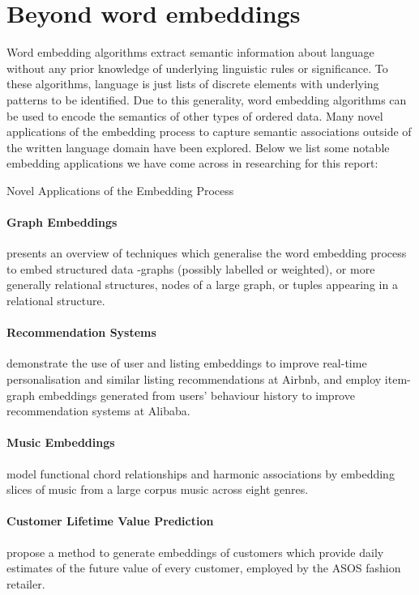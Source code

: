 \documentclass{ucetd}
\begin{document}
\section{Beyond word embeddings}
Word embedding algorithms extract semantic information about language without any prior knowledge of underlying linguistic rules or significance. To these algorithms, language is just lists of discrete elements with underlying patterns to be identified. Due to this generality, word embedding algorithms can be used to encode the semantics of other types of ordered data.
Many novel applications of the embedding process to capture semantic associations outside of the written language domain have been explored. Below we list some notable embedding applications we have come across in researching for this report:
\par
\begin{infobox}{Novel Applications of the Embedding Process}
  \paragraph{Graph Embeddings} \textcite{grohe20-word2-node2} presents an overview of techniques which generalise the word embedding process to embed structured data -graphs (possibly labelled or weighted), or more generally relational structures, nodes of a large graph, or tuples appearing in a relational structure.
  \paragraph{Recommendation Systems} \textcite{grbovic-2018-real-time-personalization} demonstrate the use of user and listing embeddings to improve real-time personalisation and similar listing recommendations at Airbnb, and \textcite{wang-2018-billion-scale-commodity-embedding} employ item-graph embeddings generated from users' behaviour history to improve recommendation systems at Alibaba.
  \paragraph{Music Embeddings} \textcite{chuan-2018-from-context-to} model functional chord relationships and harmonic associations by embedding slices of music from a large corpus music across eight genres.
  \paragraph{Customer Lifetime Value Prediction} \textcite{chamberlain17-custom-lifet-value-predic-using-embed} propose a method to generate embeddings of customers which provide daily estimates of the future value of every customer, employed by the ASOS fashion retailer.
\end{infobox}
\end{document}
